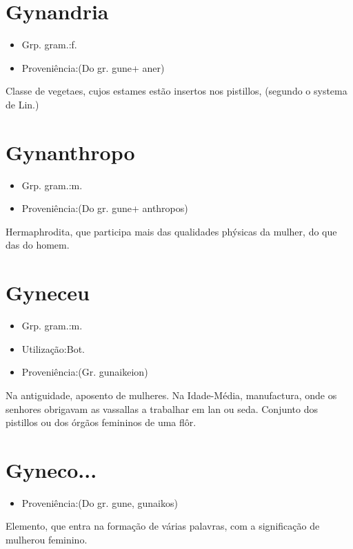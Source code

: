 \section{Gynandria}
\begin{itemize}
\item {Grp. gram.:f.}
\end{itemize}
\begin{itemize}
\item {Proveniência:(Do gr. \textunderscore gune\textunderscore  + \textunderscore aner\textunderscore )}
\end{itemize}
Classe de vegetaes, cujos estames estão insertos nos pistillos, (segundo o systema de Lin.)
\section{Gynanthropo}
\begin{itemize}
\item {Grp. gram.:m.}
\end{itemize}
\begin{itemize}
\item {Proveniência:(Do gr. \textunderscore gune\textunderscore  + \textunderscore anthropos\textunderscore )}
\end{itemize}
Hermaphrodita, que participa mais das qualidades phýsicas da mulher, do que das do homem.
\section{Gyneceu}
\begin{itemize}
\item {Grp. gram.:m.}
\end{itemize}
\begin{itemize}
\item {Utilização:Bot.}
\end{itemize}
\begin{itemize}
\item {Proveniência:(Gr. \textunderscore gunaikeion\textunderscore )}
\end{itemize}
Na antiguidade, aposento de mulheres.
Na Idade-Média, manufactura, onde os senhores obrigavam as vassallas a trabalhar em lan ou seda.
Conjunto dos pistillos ou dos órgãos femininos de uma flôr.
\section{Gyneco...}
\begin{itemize}
\item {Proveniência:(Do gr. \textunderscore gune\textunderscore , \textunderscore gunaikos\textunderscore )}
\end{itemize}
Elemento, que entra na formação de várias palavras, com a significação de \textunderscore mulher\textunderscore  ou \textunderscore feminino\textunderscore .
